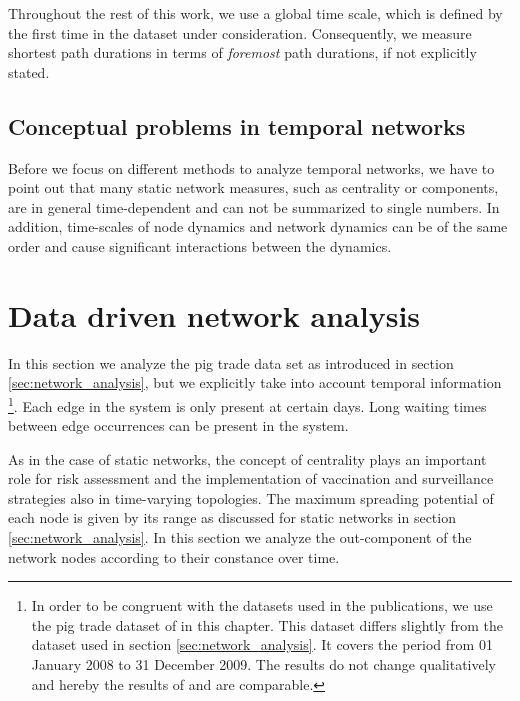 Throughout the rest of this work, we use a global time scale, which is defined by the first time in the dataset under consideration.
Consequently, we measure shortest path durations in terms of \emph{foremost} path durations, if not explicitly stated.

\subsection{Conceptual problems in temporal networks}\label{sec:conceptual_problems}
Before we focus on different methods to analyze temporal networks, we have to point out that many static network measures, such as centrality or components, are in general time-dependent and can not be summarized to single numbers.
In addition, time-scales of node dynamics and network dynamics can be of the same order and cause significant interactions between the dynamics.



\section{Data driven network analysis}\label{sec:Plos}
In this section we analyze the pig trade data set as introduced in section \ref{sec:network_analysis}, but we explicitly take into account temporal information%
\footnote{%
In order to be congruent with the datasets used in the publications, we use the pig trade dataset of \citep{Konschake:2013js} in this chapter.
This dataset differs slightly from the dataset used in section \ref{sec:network_analysis}.
It covers the period from 01 January 2008 to 31 December 2009.
The results do not change qualitatively and hereby the results of \citep{Konschake:2013js} and \citep{Lentz:2013PRL} are comparable.}. %
Each edge in the system is only present at certain days.
Long waiting times between edge occurrences can be present in the system.

As in the case of static networks, the concept of centrality plays an important role for risk assessment and the implementation of vaccination and surveillance strategies also in time-varying topologies.
The maximum spreading potential of each node is given by its range as discussed for static networks in section \ref{sec:network_analysis}.
In this section we analyze the out-component of the network nodes according to their constance over time.


